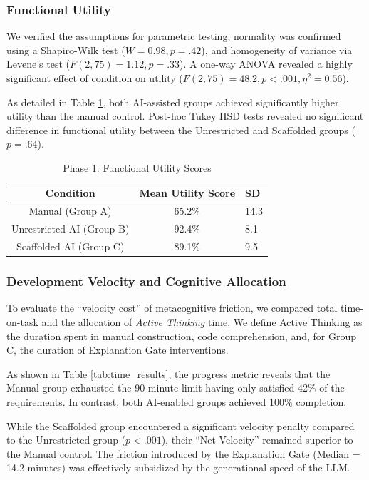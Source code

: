 \documentclass[sigconf]{acmart}
\begin{document}
\subsubsection{Functional Utility}
We verified the assumptions for parametric testing; normality was confirmed using a Shapiro-Wilk test ($W = 0.98, p = .42$), and homogeneity of variance via Levene's test ($F(2, 75) = 1.12, p = .33$). A one-way ANOVA revealed a highly significant effect of condition on utility ($F(2, 75) = 48.2, p < .001, \eta^2 = 0.56$).

As detailed in Table \ref{tab:phase1}, both AI-assisted groups achieved significantly higher utility than the manual control. Post-hoc Tukey HSD tests revealed no significant difference in functional utility between the Unrestricted and Scaffolded groups ($p = .64$).

\begin{table}[ht]
  \caption{Phase 1: Functional Utility Scores}
  \label{tab:phase1}
  \begin{tabular}{ccl}
    \toprule
    Condition & Mean Utility Score & SD\\
    \midrule
    Manual (Group A) & 65.2\% & 14.3\\
    Unrestricted AI (Group B) & 92.4\% & 8.1\\
    Scaffolded AI (Group C) & 89.1\% & 9.5\\
    \bottomrule
  \end{tabular}
\end{table}

\subsubsection{Development Velocity and Cognitive Allocation}
To evaluate the ``velocity cost'' of metacognitive friction, we compared total time-on-task and the allocation of \textit{Active Thinking} time. We define Active Thinking as the duration spent in manual construction, code comprehension, and, for Group C, the duration of Explanation Gate interventions. 

As shown in Table \ref{tab:time_results}, the progress metric reveals that the Manual group exhausted the 90-minute limit having only satisfied 42\% of the requirements. In contrast, both AI-enabled groups achieved 100\% completion. 

While the Scaffolded group encountered a significant velocity penalty compared to the Unrestricted group ($p < .001$), their ``Net Velocity'' remained superior to the Manual control. The friction introduced by the Explanation Gate (Median = 14.2 minutes) was effectively subsidized by the generational speed of the LLM. 
\end{document}
